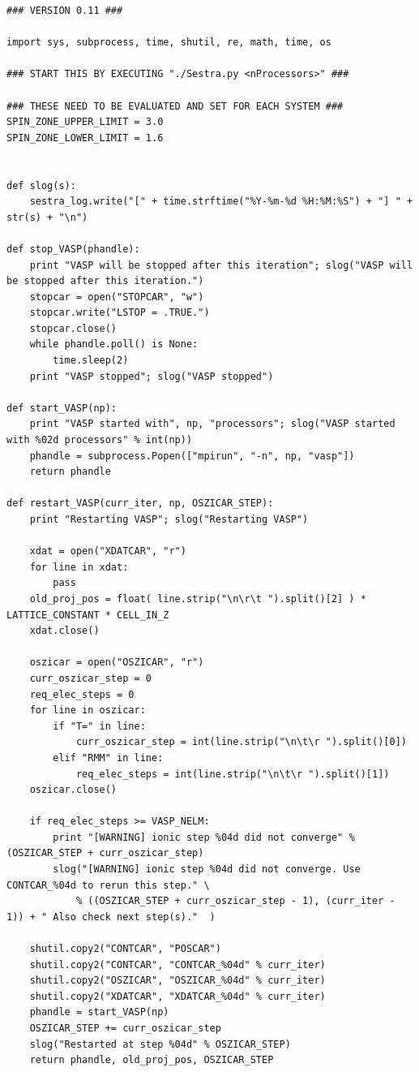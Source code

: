 \documentclass[twoside, 11pt, titlepage, captions=nooneline, a4paper, headsepline]{scrbook}%
\newcommand{\9}{\mathrm}
\newcommand{\0}{\,\mathrm}
\begin{document}
\begin{lstlisting}
### VERSION 0.11 ###

import sys, subprocess, time, shutil, re, math, time, os

### START THIS BY EXECUTING "./Sestra.py <nProcessors>" ###

### THESE NEED TO BE EVALUATED AND SET FOR EACH SYSTEM ###
SPIN_ZONE_UPPER_LIMIT = 3.0
SPIN_ZONE_LOWER_LIMIT = 1.6


def slog(s):
    sestra_log.write("[" + time.strftime("%Y-%m-%d %H:%M:%S") + "] " + str(s) + "\n")

def stop_VASP(phandle):
    print "VASP will be stopped after this iteration"; slog("VASP will be stopped after this iteration.")
    stopcar = open("STOPCAR", "w")
    stopcar.write("LSTOP = .TRUE.")
    stopcar.close()
    while phandle.poll() is None:
        time.sleep(2)
    print "VASP stopped"; slog("VASP stopped")

def start_VASP(np):
    print "VASP started with", np, "processors"; slog("VASP started with %02d processors" % int(np))
    phandle = subprocess.Popen(["mpirun", "-n", np, "vasp"])
    return phandle

def restart_VASP(curr_iter, np, OSZICAR_STEP):
    print "Restarting VASP"; slog("Restarting VASP")
    
    xdat = open("XDATCAR", "r")
    for line in xdat:
        pass
    old_proj_pos = float( line.strip("\n\r\t ").split()[2] ) * LATTICE_CONSTANT * CELL_IN_Z
    xdat.close()
    
    oszicar = open("OSZICAR", "r")
    curr_oszicar_step = 0
    req_elec_steps = 0
    for line in oszicar:
        if "T=" in line:
            curr_oszicar_step = int(line.strip("\n\t\r ").split()[0])
        elif "RMM" in line:
            req_elec_steps = int(line.strip("\n\t\r ").split()[1])
    oszicar.close()
    
    if req_elec_steps >= VASP_NELM:
        print "[WARNING] ionic step %04d did not converge" % (OSZICAR_STEP + curr_oszicar_step)
        slog("[WARNING] ionic step %04d did not converge. Use CONTCAR_%04d to rerun this step." \
            % ((OSZICAR_STEP + curr_oszicar_step - 1), (curr_iter - 1)) + " Also check next step(s)."  )
    
    shutil.copy2("CONTCAR", "POSCAR")
    shutil.copy2("CONTCAR", "CONTCAR_%04d" % curr_iter)
    shutil.copy2("OSZICAR", "OSZICAR_%04d" % curr_iter)
    shutil.copy2("XDATCAR", "XDATCAR_%04d" % curr_iter)
    phandle = start_VASP(np)
    OSZICAR_STEP += curr_oszicar_step
    slog("Restarted at step %04d" % OSZICAR_STEP)
    return phandle, old_proj_pos, OSZICAR_STEP
    


\end{lstlisting}
\end{document}
